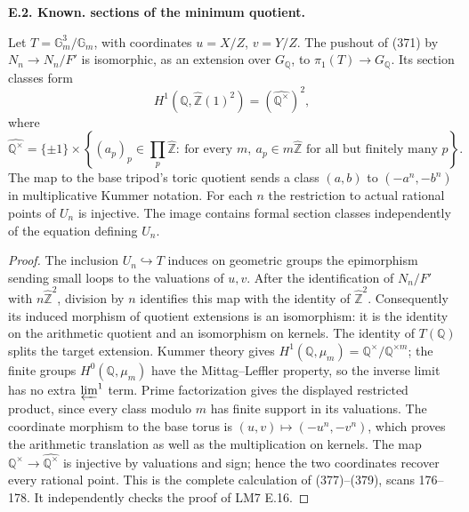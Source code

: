 \documentclass[11pt,oneside]{article}
\makeatletter
\newcounter{statementanchor}
\newenvironment{statement}[3]{%
 \refstepcounter{statementanchor}\def\@currentlabel{#1}%
 \par\addvspace{9pt}\noindent
 \textbf{#1. #2. #3.}\par\nobreak\noindent\ignorespaces
}{\par\addvspace{5pt}}
\makeatother
\begin{document}
\begin{statement}{E.2}{Known}{sections of the minimum quotient}
\label{st:E.2}
\label{E-toric}
Let $T=\mathbb G_m^3/\mathbb G_m$, with coordinates
$u=X/Z$, $v=Y/Z$. The pushout of (371) by
$N_n\to N_n/F'$ is isomorphic, as an extension over
$G_{\mathbb Q}$, to $\pi_1(T)\to G_{\mathbb Q}$.
Its section classes form
\[
 H^1(\mathbb Q,\widehat{\mathbb Z}(1)^2)
       =(\widehat{\mathbb Q^\times})^2,
\]
where
\[
 \widehat{\mathbb Q^\times}
 =\{\pm1\}\times
 \left\{(a_p)_p\in\prod_p\widehat{\mathbb Z}:
 \ \text{for every }m,\ a_p\in m\widehat{\mathbb Z}
       \text{ for all but finitely many }p\right\}.
\]
The map to the base tripod's toric quotient sends a class
$(a,b)$ to $(-a^n,-b^n)$ in multiplicative Kummer notation.
For each $n$ the restriction to actual rational points of
$U_n$ is injective. The image contains formal section classes
independently of the equation defining $U_n$.
\end{statement}
\begin{proof}
The inclusion $U_n\hookrightarrow T$ induces on geometric
groups the epimorphism sending small loops to the valuations
of $u,v$. After the identification of $N_n/F'$ with
$n\widehat{\mathbb Z}^2$, division by $n$ identifies this
map with the identity of $\widehat{\mathbb Z}^2$.
Consequently its induced morphism of quotient extensions
is an isomorphism: it is the identity on the arithmetic
quotient and an isomorphism on kernels. The identity
of $T(\mathbb Q)$ splits the target extension.
Kummer theory gives
$H^1(\mathbb Q,\mu_m)=\mathbb Q^\times/\mathbb Q^{\times m}$;
the finite groups $H^0(\mathbb Q,\mu_m)$ have the
Mittag--Leffler property, so the inverse limit has no
extra $\varprojlim^1$ term. Prime factorization gives the
displayed restricted product, since every class modulo
$m$ has finite support in its valuations.
The coordinate morphism to the base torus is
$(u,v)\mapsto(-u^n,-v^n)$, which proves the arithmetic
translation as well as the multiplication on kernels.
The map $\mathbb Q^\times\to\widehat{\mathbb Q^\times}$
is injective by valuations and sign; hence the two
coordinates recover every rational point. This is the
complete calculation of (377)--(379), scans 176--178.
It independently checks the proof of LM7 E.16.
\end{proof}
\end{document}
